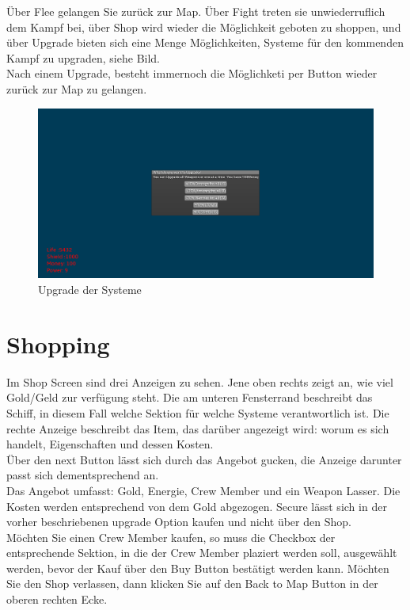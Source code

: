 \documentclass[fontsize=12pt,paper=a4,twoside]{scrartcl}
\begin{document}
Über Flee gelangen Sie zurück zur Map. Über Fight treten sie unwiederruflich dem Kampf bei, über Shop wird wieder die Möglichkeit geboten zu shoppen, und über Upgrade bieten sich eine Menge Möglichkeiten, Systeme für den kommenden Kampf zu upgraden, siehe Bild.\\
Nach einem Upgrade, besteht immernoch die Möglichketi per Button wieder zurück zur Map zu gelangen.


\begin{figure}[htp]
	\centering
	\includegraphics[width=1.00\linewidth]{pics/upgrade.png}
	\caption{Upgrade der Systeme}
	\label{fig1}
\end{figure}

\section{Shopping}

Im Shop Screen sind drei Anzeigen zu sehen. Jene oben rechts zeigt an, wie viel Gold/Geld zur verfügung steht. Die am unteren Fensterrand beschreibt das Schiff, in diesem Fall welche Sektion für welche Systeme verantwortlich ist. Die rechte Anzeige beschreibt das Item, das darüber angezeigt wird: worum es sich handelt, Eigenschaften und dessen Kosten.\\
Über den next Button lässt sich durch das Angebot gucken, die Anzeige darunter passt sich dementsprechend an.\\
Das Angebot umfasst: Gold, Energie, Crew Member und ein Weapon Lasser. Die Kosten werden entsprechend von dem Gold abgezogen. Secure lässt sich in der vorher beschriebenen upgrade Option kaufen und nicht über den Shop.\\
Möchten Sie einen Crew Member kaufen, so muss die Checkbox der entsprechende Sektion, in die der Crew Member plaziert werden soll, ausgewählt werden, bevor der Kauf über den Buy Button bestätigt werden kann. Möchten Sie den Shop verlassen, dann klicken Sie auf den Back to Map Button in der oberen rechten Ecke. 
\end{document}

